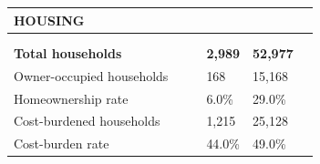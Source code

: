 \documentclass[9pt]{report}
\begin{document}
\vspace{12pt}
\setlength{\tabcolsep}{.01in} %
\begin{tabular}{p{.10in}p{.10in}p{.10in}p{3.7in}>{\hfill}p{.85in}>{\hfill}p{.85in}>{\hfill}p{.85in}>{\hfill}p{.85in}p{0.1in}}
\multicolumn{9}{l}{\parbox{7.1in}{\raggedright{\large{\strut\textbf{HOUSING}\strut}}}} \\ 
\hline
\multicolumn{4}{l}{\parbox{3.5in}{\raggedright{\textbf{}}}} & \multicolumn{1}{r}{\parbox{.85in}{\strut\raggedleft{\textbf{}\strut}}} & \multicolumn{1}{r}{\parbox{.85in}{\strut\raggedleft{\textbf{}\strut}}} & \multicolumn{1}{r}{\parbox{.85in}{\strut{}}} & \multicolumn{1}{r}{\parbox{.85in}{\strut{}}} & \\ 
\multicolumn{9}{l}{} \\ 
\multicolumn{4}{l}{\parbox{3.5in}{\strut\raggedright{\textbf{Total households}\strut}}} & \textbf{} & \textbf{} & \textbf{2,989} & \textbf{52,977} & \textbf{} \\ 
\multicolumn{4}{l}{\parbox{3.6in}{\strut\raggedright{{Owner-occupied households}}\strut}} &  &  & 168 & 15,168 & \multicolumn{1}{l}{}  \\ 
\multicolumn{4}{l}{\parbox{3.6in}{\strut\raggedright{{Homeownership rate}}\strut}} &  &  & 6.0\% & 29.0\% & \multicolumn{1}{l}{}  \\ 
\multicolumn{4}{l}{\parbox{3.6in}{\strut\raggedright{{Cost-burdened households}}\strut}} &  &  & 1,215 & 25,128 & \multicolumn{1}{l}{}  \\ 
\multicolumn{4}{l}{\parbox{3.6in}{\strut\raggedright{{Cost-burden rate}}\strut}} &  &  & 44.0\% & 49.0\% & \multicolumn{1}{l}{}  \\ 

\end{tabular}
\setlength{\tabcolsep}{6pt} %
\end{document}
